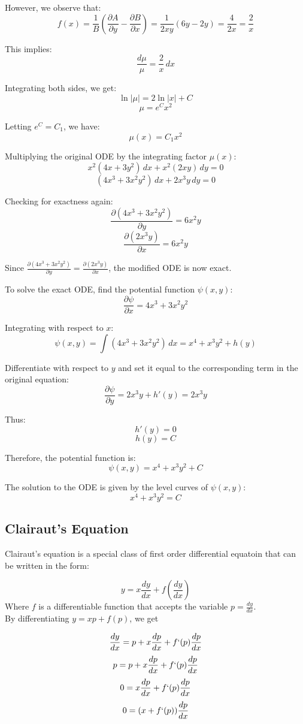 \documentclass[12pt]{article}
\begin{document}
However, we observe that:
\[ f(x) = \frac{1}{B} \left( \frac{\partial A}{\partial y} - \frac{\partial B}{\partial x} \right) = \frac{1}{2xy} (6y - 2y) = \frac{4}{2x} = \frac{2}{x} \]

This implies:
\[ \frac{d\mu}{\mu} = \frac{2}{x} \, dx \]

Integrating both sides, we get:
\[ \ln|\mu| = 2 \ln|x| + C \]
\[ \mu = e^C x^2 \]

Letting \( e^C = C_1 \), we have:
\[ \mu(x) = C_1 x^2 \]

Multiplying the original ODE by the integrating factor \( \mu(x) \):
\[ x^2 (4x + 3y^2) \, dx + x^2 (2xy) \, dy = 0 \]
\[ (4x^3 + 3x^2 y^2) \, dx + 2x^3 y \, dy = 0 \]

Checking for exactness again:
\[ \frac{\partial (4x^3 + 3x^2 y^2)}{\partial y} = 6x^2 y \]
\[ \frac{\partial (2x^3 y)}{\partial x} = 6x^2 y \]

Since \( \frac{\partial (4x^3 + 3x^2 y^2)}{\partial y} = \frac{\partial (2x^3 y)}{\partial x} \), the modified ODE is now exact.

To solve the exact ODE, find the potential function \( \psi(x, y) \):
\[ \frac{\partial \psi}{\partial x} = 4x^3 + 3x^2 y^2 \]

Integrating with respect to \( x \):
\[ \psi(x, y) = \int (4x^3 + 3x^2 y^2) \, dx = x^4 + x^3 y^2 + h(y) \]

Differentiate with respect to \( y \) and set it equal to the corresponding term in the original equation:
\[ \frac{\partial \psi}{\partial y} = 2x^3 y + h'(y) = 2x^3 y \]

Thus:
\[ h'(y) = 0 \]
\[ h(y) = C \]

Therefore, the potential function is:
\[ \psi(x, y) = x^4 + x^3 y^2 + C \]

The solution to the ODE is given by the level curves of \( \psi(x, y) \):
\[ x^4 + x^3 y^2 = C \]
\subsection{Clairaut's Equation}
Clairaut's equation is a special class of first order differential equatoin that can be written in the form:

\[y = x \frac{dy}{dx} + f\left(\frac{dy}{dx}\right)\]
Where \(f\) is a differentiable function that accepts the variable \(p  = \frac{dy}{dx}\). \\
By differentiating \(y = x p + f(p)\), we get

\[\frac{dy}{dx} = p + x \frac{dp}{dx} + f`(p)\frac{dp}{dx}\]
\[p = p + x \frac{dp}{dx} + f`(p)\frac{dp}{dx}\]
\[0=  x \frac{dp}{dx} + f`(p)\frac{dp}{dx}\]
\[0=  (x + f`(p))\frac{dp}{dx}\]
\end{document}
